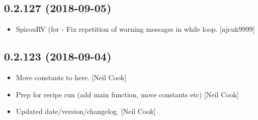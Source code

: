 \documentclass[a4paper,10pt,english]{report}
\begin{document}
\subsection{0.2.127 (2018-09-05)}
\label{\detokenize{misc/changelog:id339}}\begin{itemize}
\item {} 
SpirouRV (for  - Fix repetition of warning
messages in while loop. {[}njcuk9999{]}

\end{itemize}


\subsection{0.2.123 (2018-09-04)}
\label{\detokenize{misc/changelog:id340}}\begin{itemize}
\item {} 
Move  constants to here. {[}Neil Cook{]}

\item {} 
Prep  for recipe run (add main function, move constants
etc) {[}Neil Cook{]}

\item {} 
Updated date/version/changelog. {[}Neil Cook{]}

\end{itemize}
\end{document}
